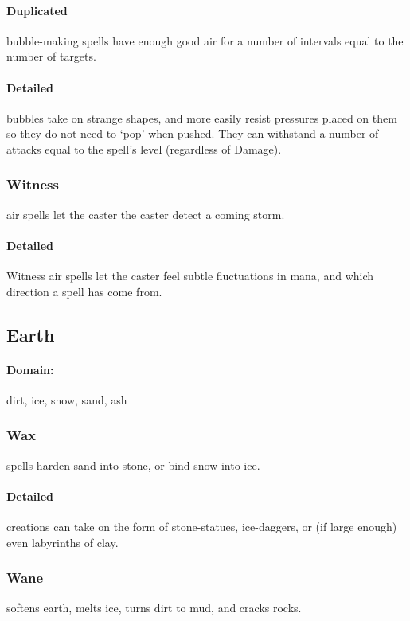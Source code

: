 \begin{multicols}{2}
\paragraph{Duplicated}
bubble-making spells have enough good air for a number of \glspl{interval} equal to the number of targets.

\paragraph{Detailed}
bubbles take on strange shapes, and more easily resist pressures placed on them so they do not need to `pop' when pushed.
They can withstand a number of attacks equal to the spell's level (regardless of Damage).

\subsubsection{Witness}
air spells let the caster the caster detect a coming storm.

\paragraph{Detailed}
Witness air spells let the caster feel subtle fluctuations in mana, and which direction a spell has come from.

\subsection{Earth}
\paragraph{Domain:}
dirt, ice, snow, sand, ash

\subsubsection{Wax}
spells harden sand into stone, or bind snow into ice.

\paragraph{Detailed}
creations can take on the form of stone-statues, ice-daggers, or (if large enough) even labyrinths of clay.

\subsubsection{Wane}
softens earth, melts ice, turns dirt to mud, and cracks rocks.


\end{multicols}

